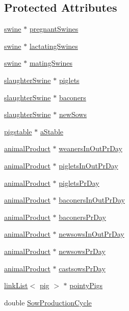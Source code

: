 \subsection*{Protected Attributes}
\begin{DoxyCompactItemize}
\item 
\hyperlink{classswine}{swine} $\ast$ \hyperlink{classswine_stock_a54c9ef8e2d53f01b1729b4ae95474dcb}{pregnantSwines}
\item 
\hyperlink{classswine}{swine} $\ast$ \hyperlink{classswine_stock_a213454f9abaa9a6981fb5a2a6975bdd6}{lactatingSwines}
\item 
\hyperlink{classswine}{swine} $\ast$ \hyperlink{classswine_stock_a3cffe5cdb0016585304a252330ee5edf}{matingSwines}
\item 
\hyperlink{classslaughter_swine}{slaughterSwine} $\ast$ \hyperlink{classswine_stock_a5eec1e1062ede0cf785bbedd5ac2a5a9}{piglets}
\item 
\hyperlink{classslaughter_swine}{slaughterSwine} $\ast$ \hyperlink{classswine_stock_a4739d5bb2beaa609383a74f8da54ea39}{baconers}
\item 
\hyperlink{classslaughter_swine}{slaughterSwine} $\ast$ \hyperlink{classswine_stock_a7dca40c98b0767777d0532e39e9743e8}{newSows}
\item 
\hyperlink{classpigstable}{pigstable} $\ast$ \hyperlink{classswine_stock_a78239ce5b75f52957d37b09e3bb8fbb9}{aStable}
\item 
\hyperlink{classanimal_product}{animalProduct} $\ast$ \hyperlink{classswine_stock_a57fbbfb80947a28f38fcda05d8bd8202}{weanersInOutPrDay}
\item 
\hyperlink{classanimal_product}{animalProduct} $\ast$ \hyperlink{classswine_stock_a72f271f475a890dd470266dca393e047}{pigletsInOutPrDay}
\item 
\hyperlink{classanimal_product}{animalProduct} $\ast$ \hyperlink{classswine_stock_af838d48f89fc191c9da140838e255ed9}{pigletsPrDay}
\item 
\hyperlink{classanimal_product}{animalProduct} $\ast$ \hyperlink{classswine_stock_a5974de43fdfb3a412be2ddefe1723e14}{baconersInOutPrDay}
\item 
\hyperlink{classanimal_product}{animalProduct} $\ast$ \hyperlink{classswine_stock_a5e5538e17b43af6d9cfc46819311c65d}{baconersPrDay}
\item 
\hyperlink{classanimal_product}{animalProduct} $\ast$ \hyperlink{classswine_stock_a3d37e7fb0bdf7ba6cab85f33016f39d0}{newsowsInOutPrDay}
\item 
\hyperlink{classanimal_product}{animalProduct} $\ast$ \hyperlink{classswine_stock_a6841145e5c99f8db31c115a1022cd758}{newsowsPrDay}
\item 
\hyperlink{classanimal_product}{animalProduct} $\ast$ \hyperlink{classswine_stock_a904a032504459d88941e059e2a7522d3}{castsowsPrDay}
\item 
\hyperlink{classlink_list}{linkList}$<$ \hyperlink{classpig}{pig} $>$ $\ast$ \hyperlink{classswine_stock_a259003746b904e3ed546e7a23fd04210}{pointyPigs}
\item 
double \hyperlink{classswine_stock_a30d8224d05f918effe9db2c8329245c6}{SowProductionCycle}
\end{DoxyCompactItemize}


